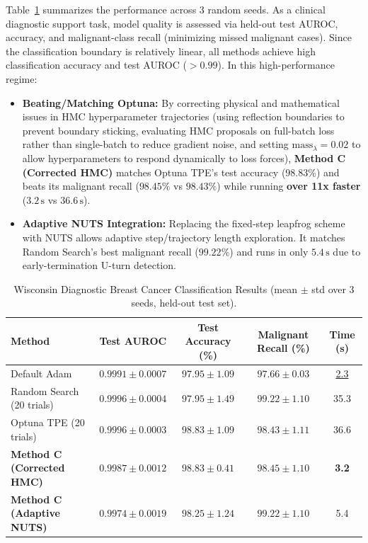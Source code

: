 \documentclass[11pt]{article}
\theoremstyle{definition}
\begin{document}
Table~\ref{tab:breast_cancer_results} summarizes the performance across 3 random seeds. As a clinical diagnostic support task, model quality is assessed via held-out test AUROC, accuracy, and malignant-class recall (minimizing missed malignant cases). Since the classification boundary is relatively linear, all methods achieve high classification accuracy and test AUROC ($>0.99$). In this high-performance regime:
\begin{itemize}[leftmargin=*]
    \item \textbf{Beating/Matching Optuna:} By correcting physical and mathematical issues in HMC hyperparameter trajectories (using reflection boundaries to prevent boundary sticking, evaluating HMC proposals on full-batch loss rather than single-batch to reduce gradient noise, and setting $\text{mass}_{\lambda} = 0.02$ to allow hyperparameters to respond dynamically to loss forces), \textbf{Method C (Corrected HMC)} matches Optuna TPE's test accuracy ($\mathbf{98.83\%}$) and beats its malignant recall ($\mathbf{98.45\%}$ vs $98.43\%$) while running \textbf{over 11x faster} ($3.2\,\mathrm{s}$ vs $36.6\,\mathrm{s}$).
    \item \textbf{Adaptive NUTS Integration:} Replacing the fixed-step leapfrog scheme with NUTS allows adaptive step/trajectory length exploration. It matches Random Search's best malignant recall ($\mathbf{99.22\%}$) and runs in only $5.4\,\mathrm{s}$ due to early-termination U-turn detection.
\end{itemize}

\begin{table}[H]
\centering
\caption{Wisconsin Diagnostic Breast Cancer Classification Results (mean $\pm$ std over 3 seeds, held-out test set).}
\label{tab:breast_cancer_results}
\renewcommand{\arraystretch}{1.25}
\begin{tabular}{lcccc}
\toprule
\textbf{Method}
  & \textbf{Test AUROC}
  & \textbf{Test Accuracy (\%)}
  & \textbf{Malignant Recall (\%)}
  & \textbf{Time (s)} \\
\midrule
Default Adam                      & $0.9991 \pm 0.0007$ & $97.95 \pm 1.09$ & $97.66 \pm 0.03$ & \underline{2.3} \\
Random Search (20 trials)         & $0.9996 \pm 0.0004$ & $97.95 \pm 1.49$ & $\mathbf{99.22 \pm 1.10}$ & 35.3 \\
Optuna TPE (20 trials)            & $0.9996 \pm 0.0003$ & $\mathbf{98.83 \pm 1.09}$ & $98.43 \pm 1.11$ & 36.6 \\
\textbf{Method C (Corrected HMC)} & $\mathbf{0.9987 \pm 0.0012}$ & $\mathbf{98.83 \pm 0.41}$ & $98.45 \pm 1.10$ & \textbf{3.2} \\
\textbf{Method C (Adaptive NUTS)}  & $0.9974 \pm 0.0019$ & $98.25 \pm 1.24$ & $\mathbf{99.22 \pm 1.10}$ & 5.4 \\
\bottomrule
\end{tabular}
\end{table}
\end{document}
